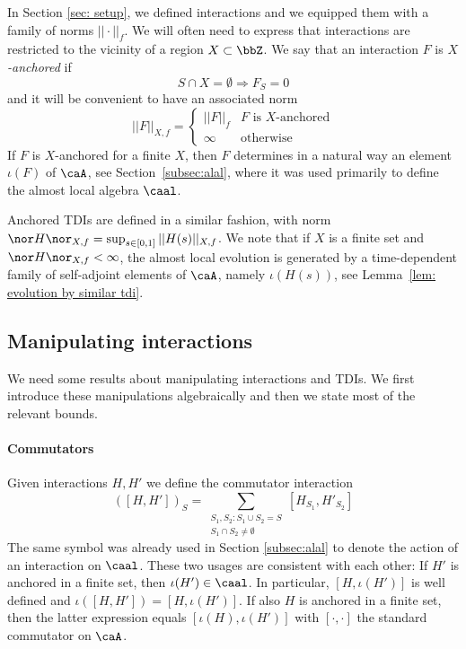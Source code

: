 In Section \ref{sec: setup}, we defined interactions and we equipped them with a family of norms $||\cdot||_f$. We will often need to express that interactions are restricted to the vicinity of a region $X\subset\bbZ$. We say that an interaction $F$ is \emph{$X$-anchored} if 
$$
S \cap X=\emptyset\Rightarrow  F_S=0
$$
and it will be convenient to have an associated norm
%
\begin{equation}\label{AnchoredInt}
||F||_{X,f}=\begin{cases} ||F||_{f}   & \text{$F$ is $X$-anchored} \\
\infty  &   \text{otherwise}
\end{cases}
\end{equation}
%
If  $ F$ is $X$-anchored for a finite $X$, 
then $F$ determines in a natural way an element $\iota(F)$ of $\caA$, see Section~\ref{subsec:alal}, where it was used primarily to define the almost local algebra $\caal$.

Anchored TDIs are defined in a similar fashion, with norm $
\nor H \nor_{X,f}=\sup_{s\in[0,1]} ||H(s)||_{X,f}$. We note that if $X$ is a finite set and $\nor H \nor_{X,f}<\infty$, the almost local evolution is generated by a time-dependent family of self-adjoint elements of $\caA$, namely $\iota(H(s))$, see Lemma~\ref{lem: evolution by similar tdi}.


\subsection{Manipulating interactions} \label{sec: manipulating interactions}
We need some results about manipulating interactions and TDIs.
We first introduce these manipulations algebraically and then we state most of the relevant bounds. 
\paragraph{Commutators} Given interactions $H,H'$ we define the commutator interaction
$$
([H,H'])_S= \sum_{\substack{ S_1,S_2:  S_1\cup S_2=S \\  S_1 \cap S_2 \neq\emptyset} }   [H_{S_1},H'_{S_2}]
$$
The same symbol was already used in Section \ref{subsec:alal}  to denote the action of an interaction on $\caal$. These two usages are consistent with each other:  If $H'$ is anchored in a finite set, then $\iota(H')\in\caal$. In particular, $[H,\iota(H')]$ is well defined and $\iota([H,H'])=[H,\iota(H')]$. If also $H$ is anchored in a finite set, then the latter expression equals  $[\iota(H),\iota(H')]$ with $[\cdot,\cdot]$ the standard commutator on $\caA$. 



